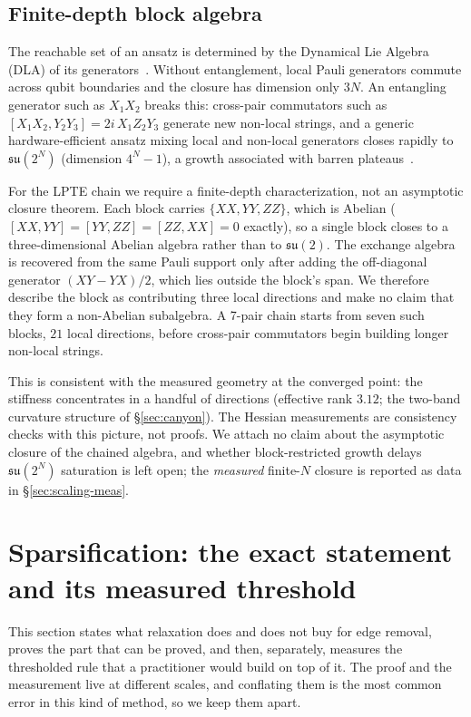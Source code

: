 \documentclass[twocolumn,aps,prl,superscriptaddress,showkeys]{revtex4-2}
\theoremstyle{plain}
\theoremstyle{definition}
\begin{document}
\subsection{Finite-depth block algebra}

The reachable set of an ansatz is determined by the Dynamical Lie Algebra (DLA) of its generators~\cite{Sim2019}. Without entanglement, local Pauli generators commute across qubit boundaries and the closure has dimension only $3N$. An entangling generator such as $X_1X_2$ breaks this: cross-pair commutators such as $[X_1X_2,Y_2Y_3]=2i\,X_1Z_2Y_3$ generate new non-local strings, and a generic hardware-efficient ansatz mixing local and non-local generators closes rapidly to $\mathfrak{su}(2^N)$ (dimension $4^N-1$), a growth associated with barren plateaus~\cite{Holmes2022}.

For the LPTE chain we require a finite-depth characterization, not an asymptotic closure theorem. Each block carries $\{XX,YY,ZZ\}$, which is Abelian ($[XX,YY]=[YY,ZZ]=[ZZ,XX]=0$ exactly), so a single block closes to a three-dimensional Abelian algebra rather than to $\mathfrak{su}(2)$. The exchange algebra is recovered from the same Pauli support only after adding the off-diagonal generator $(XY-YX)/2$, which lies outside the block's span. We therefore describe the block as contributing three local directions and make no claim that they form a non-Abelian subalgebra. A 7-pair chain starts from seven such blocks, $21$ local directions, before cross-pair commutators begin building longer non-local strings.

This is consistent with the measured geometry at the converged point: the stiffness concentrates in a handful of directions (effective rank $3.12$; the two-band curvature structure of \S\ref{sec:canyon}). The Hessian measurements are consistency checks with this picture, not proofs. We attach no claim about the asymptotic closure of the chained algebra, and whether block-restricted growth delays $\mathfrak{su}(2^N)$ saturation is left open; the \emph{measured} finite-$N$ closure is reported as data in \S\ref{sec:scaling-meas}.%
\section{Sparsification: the exact statement and its measured threshold}
\label{sec:sparsification}

This section states what relaxation does and does not buy for edge removal, proves the part that can be proved, and then, separately, measures the thresholded rule that a practitioner would build on top of it. The proof and the measurement live at different scales, and conflating them is the most common error in this kind of method, so we keep them apart.
\end{document}
